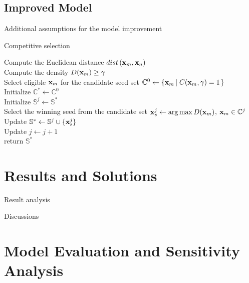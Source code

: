 \documentclass[12pt,a4paper]{article}
\begin{document}
\begin{spacing}{1.2}
\subsection{Improved Model}

Additional assumptions for the model improvement


\begin{algorithm}  
    \caption{Competitive selection}  
    \label{CompetitiveSeedSelectionAlgorithm}
    
    Compute the Euclidean distance $dist \left( {\bold{x}_m}, {\bold{x}_n} \right)$ \\  
    Compute the density $D( {\bold{x}_m} ) \ge \gamma$ \\ 
    Select eligible $\bold{x}_m$ for the candidate seed set $\mathbb{C}^0 \gets \left\{  \bold{x}_m \left| \; C( {\bold{x}_m}, \gamma ) = 1\right. \right\}$ \\ 
    Initialize $\mathbb{C}^* \gets \mathbb{C}^0$\\
    { 
      Initialize $\mathbb{S}^j \gets \mathbb{S}^*$ \\
      Select the winning seed from the candidate set $\bold{x}_s^j \gets \mathop {\arg \max } D({\bold{x}_m})$, ${\bold{x}_m} \in \mathbb{C}^j$ \\
      Update $\mathbb{S}^* \gets \mathbb{S}^j \cup \{ \bold{x}_s^j \}$ \\
      Update $j \gets j + 1$ \\
    }
    return $\mathbb{S}^*$ \\
\end{algorithm} 


\section{Results and Solutions}
\label{Results_Solutions}

Result analysis

Discussions



\section{Model Evaluation and Sensitivity Analysis}
\label{ModelEvaluation_SensitivityAnalysis}




\end{spacing}
\end{document}
